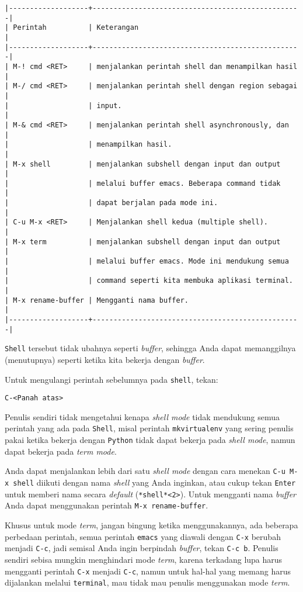 \documentclass{article}
\begin{document}
\begin{verbatim}
|-------------------+--------------------------------------------------|
| Perintah          | Keterangan                                       |
|-------------------+--------------------------------------------------|
| M-! cmd <RET>     | menjalankan perintah shell dan menampilkan hasil |
| M-/ cmd <RET>     | menjalankan perintah shell dengan region sebagai |
|                   | input.                                           |
| M-& cmd <RET>     | menjalankan perintah shell asynchronously, dan   |
|                   | menampilkan hasil.                               |
| M-x shell         | menjalankan subshell dengan input dan output     |
|                   | melalui buffer emacs. Beberapa command tidak     |
|                   | dapat berjalan pada mode ini.                    |
| C-u M-x <RET>     | Menjalankan shell kedua (multiple shell).        |
| M-x term          | menjalankan subshell dengan input dan output     |
|                   | melalui buffer emacs. Mode ini mendukung semua   |
|                   | command seperti kita membuka aplikasi terminal.  |
| M-x rename-buffer | Mengganti nama buffer.                           |
|-------------------+--------------------------------------------------|
\end{verbatim}

\verb=Shell= tersebut tidak ubahnya seperti \emph{buffer}, sehingga Anda dapat 
memanggilnya (menutupnya) seperti ketika kita bekerja dengan \emph{buffer}.

Untuk mengulangi perintah sebelumnya pada \verb=shell=, tekan:

\begin{verbatim}
C-<Panah atas>
\end{verbatim}

Penulis sendiri tidak mengetahui kenapa \emph{shell mode} tidak mendukung
semua perintah yang ada pada \verb=Shell=, misal perintah \verb=mkvirtualenv=
yang sering penulis pakai ketika bekerja dengan \verb=Python= tidak dapat 
bekerja pada \emph{shell mode}, namun dapat bekerja pada \emph{term mode}.

Anda dapat menjalankan lebih dari satu \emph{shell mode} dengan cara 
menekan \verb=C-u M-x shell= diikuti dengan nama \emph{shell} yang Anda 
inginkan, atau cukup tekan \verb=Enter= untuk memberi nama secara 
\emph{default} (\verb=*shell*<2>=). Untuk mengganti nama \emph{buffer}
Anda dapat menggunakan perintah \verb=M-x rename-buffer=.

Khusus untuk mode \emph{term}, jangan bingung ketika menggunakannya, ada
beberapa perbedaan perintah, semua perintah \verb=emacs= yang diawali dengan
\verb=C-x= berubah menjadi \verb=C-c=, jadi semisal Anda ingin berpindah
\emph{buffer}, tekan \verb=C-c b=. Penulis sendiri sebisa mungkin menghindari
mode \emph{term}, karena terkadang lupa harus mengganti perintah \verb=C-x=
menjadi \verb=C-c=, namun untuk hal-hal yang memang harus dijalankan melalui
\verb=terminal=, mau tidak mau penulis menggunakan mode \emph{term}.
\end{document}
